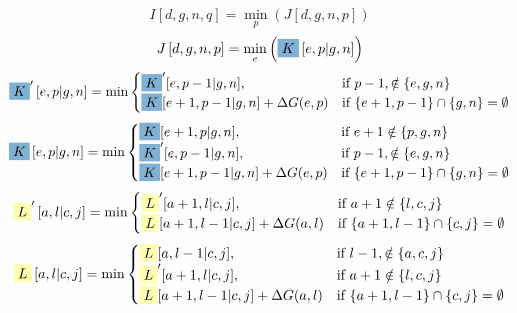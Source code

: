 \documentclass{article}
\begin{document}
$$ I\left[ d,g,n,q \right] =\min_{ p } \left( J\left[d,g,n,p\right]\right) $$
$$ J\left[ d,g,n,p \right] =\min_{ e } \left( \colorbox{c4}{$K$}\left[e,p|g,n\right]\right) $$
$$ \colorbox{c4}{$K$}' \left[e,p | g,n \right] =  \min\begin{cases}\colorbox{c4}{$K$}'[ e , p-1|g,n ], &\text{if } p-1 ,\notin\{ e , g,n \} \\\colorbox{c4}{$K$}[ e+1 , p-1|g,n ]+\Delta G(e,p) &\text{if } \{ e+1 , p-1 \}\cap \{ g,n \}=\emptyset\end{cases}$$
$$ \colorbox{c4}{$K$} \left[e,p | g,n \right] =  \min\begin{cases}\colorbox{c4}{$K$}[ e+1 , p|g,n ], &\text{if } e+1 \notin\{ p , g,n \} \\\colorbox{c4}{$K$}'[ e , p-1|g,n ], &\text{if } p-1 ,\notin\{ e , g,n \} \\\colorbox{c4}{$K$}[ e+1 , p-1|g,n ]+\Delta G(e,p) &\text{if } \{ e+1 , p-1 \}\cap \{ g,n \}=\emptyset\end{cases}$$
$$ \colorbox{c1}{$L$}' \left[a,l | c,j \right] =  \min\begin{cases}\colorbox{c1}{$L$}'[ a+1 , l|c,j ], &\text{if } a+1 \notin\{ l , c,j \} \\\colorbox{c1}{$L$}[ a+1 , l-1|c,j ]+\Delta G(a,l) &\text{if } \{ a+1 , l-1 \}\cap \{ c,j \}=\emptyset\end{cases}$$
$$ \colorbox{c1}{$L$} \left[a,l | c,j \right] =  \min\begin{cases}\colorbox{c1}{$L$}[ a , l-1|c,j ], &\text{if } l-1 ,\notin\{ a , c,j \} \\\colorbox{c1}{$L$}'[ a+1 , l|c,j ], &\text{if } a+1 \notin\{ l , c,j \} \\\colorbox{c1}{$L$}[ a+1 , l-1|c,j ]+\Delta G(a,l) &\text{if } \{ a+1 , l-1 \}\cap \{ c,j \}=\emptyset\end{cases}$$
\end{document}

